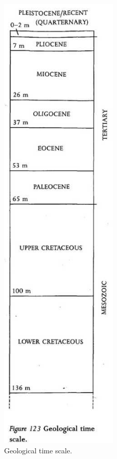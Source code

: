 \begin{figure}
	\includegraphics[width=0.5\textwidth]{graphics/figure123timescale.jpg}
	\centering
	\caption[Geological time scale]{Geological time scale.}
	\label{fig:123timescale}
\end{figure}

